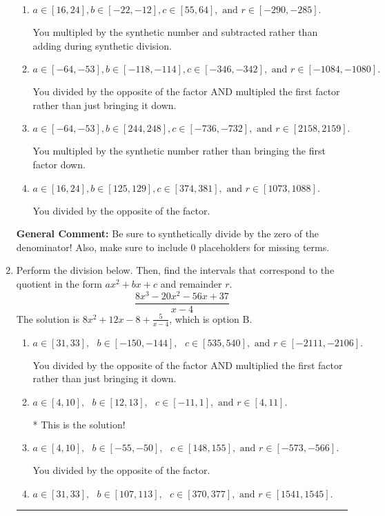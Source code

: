 \documentclass{extbook}[14pt]
\newcommand{\litem}[1]{\item #1

\rule{\textwidth}{0.4pt}}
\begin{document}
\begin{enumerate}
{\begin{enumerate}[label=\Alph*.]
* This is the solution!
\item \( a \in [16, 24], b \in [-22, -12], c \in [55, 64], \text{ and } r \in [-290, -285]. \)

 You multipled by the synthetic number and subtracted rather than adding during synthetic division.
\item \( a \in [-64, -53], b \in [-118, -114], c \in [-346, -342], \text{ and } r \in [-1084, -1080]. \)

 You divided by the opposite of the factor AND multipled the first factor rather than just bringing it down.
\item \( a \in [-64, -53], b \in [244, 248], c \in [-736, -732], \text{ and } r \in [2158, 2159]. \)

 You multipled by the synthetic number rather than bringing the first factor down.
\item \( a \in [16, 24], b \in [125, 129], c \in [374, 381], \text{ and } r \in [1073, 1088]. \)

 You divided by the opposite of the factor.
\end{enumerate}

\textbf{General Comment:} Be sure to synthetically divide by the zero of the denominator! Also, make sure to include 0 placeholders for missing terms.
}
\litem{
Perform the division below. Then, find the intervals that correspond to the quotient in the form $ax^2+bx+c$ and remainder $r$.
\[ \frac{8x^{3} -20 x^{2} -56 x + 37}{x -4} \]The solution is \( 8x^{2} +12 x -8 + \frac{5}{x -4} \), which is option B.\begin{enumerate}[label=\Alph*.]
\item \( a \in [31, 33], \text{   } b \in [-150, -144], \text{   } c \in [535, 540], \text{   and   } r \in [-2111, -2106]. \)

 You divided by the opposite of the factor AND multiplied the first factor rather than just bringing it down.
\item \( a \in [4, 10], \text{   } b \in [12, 13], \text{   } c \in [-11, 1], \text{   and   } r \in [4, 11]. \)

* This is the solution!
\item \( a \in [4, 10], \text{   } b \in [-55, -50], \text{   } c \in [148, 155], \text{   and   } r \in [-573, -566]. \)

 You divided by the opposite of the factor.
\item \( a \in [31, 33], \text{   } b \in [107, 113], \text{   } c \in [370, 377], \text{   and   } r \in [1541, 1545]. \)


\end{enumerate}}
\end{enumerate}
\end{document}
